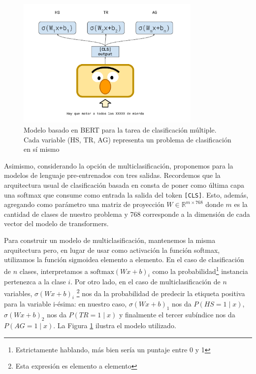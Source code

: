 \begin{figure}
    \centering
    \includegraphics[width=0.8\textwidth]{img/05/bert_model_hateval.pdf}
    \caption{Modelo basado en BERT para la tarea de clasificación múltiple. Cada variable (HS, TR, AG) representa un problema de clasificación en sí mismo}
    \label{fig:bert_hateval_classifier}
\end{figure}


Asimismo, considerando la opción de multiclasificación, proponemos para la \subtaskb{} modelos de lenguaje pre-entrenados con tres salidas. Recordemos que la arquitectura usual de clasificación basada en \bert{} consta de poner como última capa una softmax que consume como entrada la salida del token \verb|[CLS]|. Esto, además, agregando como parámetro una matriz de proyección $W \in \mathbb{R}^{m \times 768}$ donde $m$ es la cantidad de clases de nuestro problema y 768 corresponde a la dimensión de cada vector del modelo de transformers.

Para construir un modelo de multiclasificación, mantenemos la misma arquitectura pero, en lugar de usar como activación la función softmax, utilizamos la función sigmoidea elemento a elemento. En el caso de clasificación de $n$ clases, interpretamos a $\text{softmax}(W x + b)_i$ como la probabilidad\footnote{Estrictamente hablando, más bien sería un puntaje entre 0 y 1} instancia pertenezca a la clase $i$. Por otro lado, en el caso de multiclasificación de $n$ variables, $\sigma(W x + b)_i$ \footnote{Esta expresión es elemento a elemento} nos da la probabilidad de predecir la etiqueta positiva para la variable i-ésima: en nuestro caso, $\sigma(W x + b)_1$ nos da $P(HS = 1\mid x)$,  $\sigma(W x + b)_2$ nos da  $P(TR = 1 \mid x)$ y finalmente el tercer subíndice nos da  $P(AG = 1\mid x)$. La Figura \ref{fig:bert_hateval_classifier} ilustra el modelo utilizado.

